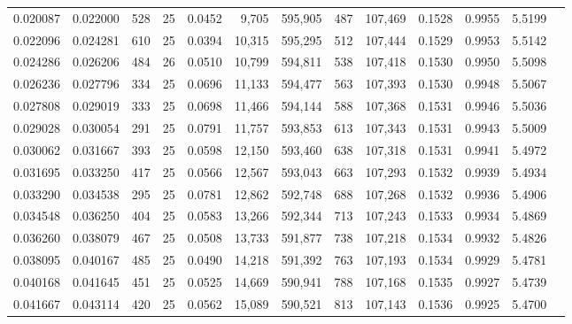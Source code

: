 \begin{tabular}{rrrrrrrrrrrrr}
0.020087 & 0.022000 &   528 &  25 &                                     0.0452 &   9,705 & 595,905 &     487 & 107,469 & 0.1528 & 0.9955 & 5.5199 \\
0.022096 & 0.024281 &   610 &  25 &                                     0.0394 &  10,315 & 595,295 &     512 & 107,444 & 0.1529 & 0.9953 & 5.5142 \\
0.024286 & 0.026206 &   484 &  26 &                                     0.0510 &  10,799 & 594,811 &     538 & 107,418 & 0.1530 & 0.9950 & 5.5098 \\
0.026236 & 0.027796 &   334 &  25 &                                     0.0696 &  11,133 & 594,477 &     563 & 107,393 & 0.1530 & 0.9948 & 5.5067 \\
0.027808 & 0.029019 &   333 &  25 &                                     0.0698 &  11,466 & 594,144 &     588 & 107,368 & 0.1531 & 0.9946 & 5.5036 \\
0.029028 & 0.030054 &   291 &  25 &                                     0.0791 &  11,757 & 593,853 &     613 & 107,343 & 0.1531 & 0.9943 & 5.5009 \\
0.030062 & 0.031667 &   393 &  25 &                                     0.0598 &  12,150 & 593,460 &     638 & 107,318 & 0.1531 & 0.9941 & 5.4972 \\
0.031695 & 0.033250 &   417 &  25 &                                     0.0566 &  12,567 & 593,043 &     663 & 107,293 & 0.1532 & 0.9939 & 5.4934 \\
0.033290 & 0.034538 &   295 &  25 &                                     0.0781 &  12,862 & 592,748 &     688 & 107,268 & 0.1532 & 0.9936 & 5.4906 \\
0.034548 & 0.036250 &   404 &  25 &                                     0.0583 &  13,266 & 592,344 &     713 & 107,243 & 0.1533 & 0.9934 & 5.4869 \\
0.036260 & 0.038079 &   467 &  25 &                                     0.0508 &  13,733 & 591,877 &     738 & 107,218 & 0.1534 & 0.9932 & 5.4826 \\
0.038095 & 0.040167 &   485 &  25 &                                     0.0490 &  14,218 & 591,392 &     763 & 107,193 & 0.1534 & 0.9929 & 5.4781 \\
0.040168 & 0.041645 &   451 &  25 &                                     0.0525 &  14,669 & 590,941 &     788 & 107,168 & 0.1535 & 0.9927 & 5.4739 \\
0.041667 & 0.043114 &   420 &  25 &                                     0.0562 &  15,089 & 590,521 &     813 & 107,143 & 0.1536 & 0.9925 & 5.4700 \\

\end{tabular}
